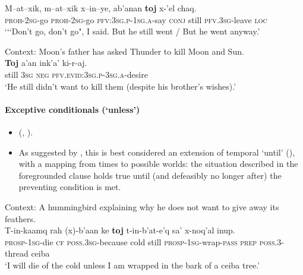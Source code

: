 \begin{exe}
	\ex\label{exappendixKekchíConcessive1}
	\gll M–at–xik, m–at–xik x–in–ye, ab’anan \textbf{toj} x-'el chaq.\\
	\textsc{proh}-2\textsc{sg}-go \textsc{proh}-2\textsc{sg}-go \textsc{pfv}:3\textsc{sg}.\textsc{p}-1\textsc{sg}.\textsc{a}-say \textsc{conj} still \textsc{pfv}.3\textsc{sg}-leave \textsc{loc}\\
	\glt \lq {\lq\lq}Don't go, don't go", I said. But he still went / But he went anyway.' \parencite[461]{Kockelman2020}

	\ex\label{exappendixKekchíConcessive2}
	Context: Moon's father has asked Thunder to kill Moon and Sun.\\
	\gll \textbf{Toj} a'an ink'a' ki-r-aj.\\
	still 3\textsc{sg} \textsc{neg} \textsc{pfv}.\textsc{evid}:3\textsc{sg}.\textsc{p}-3\textsc{sg}.\textsc{a}-desire\\
	\glt \lq He still didn't want to kill them (despite his brother's wishes).' \parencite[462–463]{Kockelman2020}
\end{exe}

\paragraph{Exceptive conditionals (\lq unless\rq)}\label{appendixKekchiUnless}
\begin{itemize}
	\item \citeauthor{Kockelman2010} (\citeyear[106]{Kockelman2010}, \citeyear[467]{Kockelman2020}).
	\item As suggested by \textcite{Kockelman2020}, this is best considered an extension of temporal \lq until\rq{ } (), with a mapping from times to possible worlds: the situation described in the foregrounded clause holds true until (and defeasibly no longer after) the preventing condition is met. 
\end{itemize}

\begin{exe}
	\ex Context: A hummingbird explaining why he does not want to give away its feathers.\\
	\gll T-in-kaamq rah \textup{(}x\textup{)}-b'aan ke \textbf{toj} t-in-b'at-e'q sa' x-noq'al inup.\\
	\textsc{prosp}-1\textsc{sg}-die \textsc{cf} \phantom{(}\textsc{poss}.3\textsc{sg}-because cold still \textsc{prosp}-1\textsc{sg}-wrap-\textsc{pass} \textsc{prep} \textsc{poss}.3-thread ceiba\\
	\glt \lq I will die of the cold unless I am wrapped in the bark of a ceiba tree.' \parencite[467]{Kockelman2020}
\end{exe}

